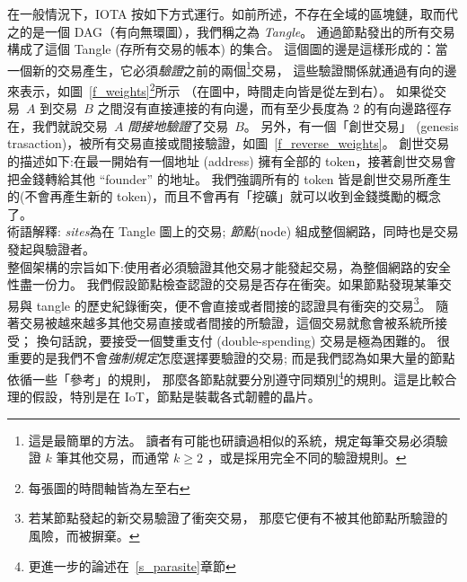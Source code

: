 \documentclass[12pt]{article}
\begin{document}
\begin{CJK}{UTF8}{bkai}
在一般情況下，IOTA 按如下方式運行。如前所述，不存在全域的區塊鏈，取而代之的是一個 DAG（有向無環圖），我們稱之為 \emph{Tangle}。
通過節點發出的所有交易構成了這個 Tangle (存所有交易的帳本) 的集合。
這個圖的邊是這樣形成的：當一個新的交易產生，它必須\emph{驗證}之前的兩個\footnote{這是最簡單的方法。
讀者有可能也研讀過相似的系統，規定每筆交易必須驗證 $k$ 筆其他交易，而通常 $k\geq 2$ ，或是採用完全不同的驗證規則。}交易，
這些驗證關係就通過有向的邊來表示，如圖~\ref{f_weights}\footnote{每張圖的時間軸皆為左至右}所示
（在圖中，時間走向皆是從左到右）。
如果從交易~$A$ 到交易~$B$ 之間沒有直接連接的有向邊，而有至少長度為 2 的有向邊路徑存在，我們就說交易~$A$ \emph{間接地驗證}了交易~$B$。
另外，有一個「創世交易」 (genesis trasaction)，被所有交易直接或間接驗證，如圖~\ref{f_reverse_weights}。
創世交易的描述如下:在最一開始有一個地址 (address) 擁有全部的 token，接著創世交易會把金錢轉給其他 ``founder'' 的地址。
我們強調所有的 token 皆是創世交易所產生的(不會再產生新的 token)，而且不會再有「挖礦」就可以收到金錢獎勵的概念了。\leavevmode\\
術語解釋: \emph{sites}為在 Tangle 圖上的交易;
\emph{節點}(node) 組成整個網路，同時也是交易發起與驗證者。\leavevmode\\
整個架構的宗旨如下:使用者必須驗證其他交易才能發起交易，為整個網路的安全性盡一份力。
我們假設節點檢查認證的交易是否存在衝突。如果節點發現某筆交易與 tangle 的歷史紀錄衝突，便不會直接或者間接的認證具有衝突的交易\footnote{若某節點發起的新交易驗證了衝突交易，
那麼它便有不被其他節點所驗證的風險，而被摒棄。}。
隨著交易被越來越多其他交易直接或者間接的所驗證，這個交易就愈會被系統所接受；
換句話說，要接受一個雙重支付 (double-spending) 交易是極為困難的。
很重要的是我們不會\emph{強制規定}怎麼選擇要驗證的交易;
而是我們認為如果大量的節點依循一些「參考」的規則，
那麼各節點就要分別遵守同類別\footnote{更進一步的論述在~\ref{s_parasite}章節}的規則。這是比較合理的假設，特別是在 IoT，節點是裝載各式韌體的晶片。\leavevmode\\


\end{CJK}
\end{document}
